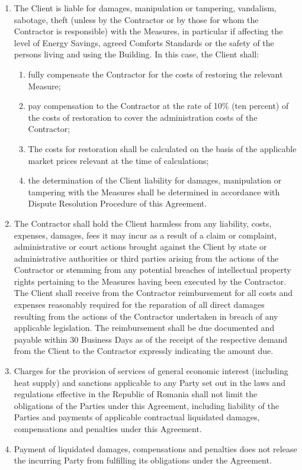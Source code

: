 \begin{multicols}{2}
\begin{enumerate}
\begin{enumerate}
	\end{enumerate}
	\item	The Client is liable for damages, manipulation or tampering, vandalism, sabotage, theft (unless by the Contractor or by those for whom the Contractor is responsible) with the Measures, in particular if affecting the level of Energy Savings, agreed Comforts Standards or the safety of the persons living and using the Building. In this case, the Client shall:
	\begin{enumerate}
		\item	fully compensate the Contractor for the costs of restoring the relevant Measure;
		\item	pay compensation to the Contractor at the rate of 10\% (ten percent) of the costs of restoration to cover the administration costs of the Contractor;
		\item	The costs for restoration shall be calculated on the basis of the applicable market prices relevant at the time of calculations;
		\item	the determination of the Client liability for damages, manipulation or tampering with the Measures shall be determined in accordance with Dispute Resolution Procedure of this Agreement.
	\end{enumerate}
	\item	The Contractor shall hold the Client harmless from any liability, costs, expenses, damages, fees it may incur as a result of a claim or complaint, administrative or court actions brought against the Client by state or administrative authorities or third parties arising from the actions of the Contractor or stemming from any potential breaches of intellectual property rights pertaining to the Measures having been executed by the Contractor. The Client shall receive from the Contractor reimbursement for all costs and expenses reasonably required for the reparation of all direct damages resulting from the actions of the Contractor undertaken in breach of any applicable legislation. The reimbursement shall be due documented and payable within 30 Business Days as of the receipt of the respective demand from the Client to the Contractor expressly indicating the amount due.
	\item	Charges for the provision of services of general economic interest (including heat supply) and sanctions applicable to any Party set out in the laws and regulations effective in the Republic of Romania shall not limit the obligations of the Parties under this Agreement, including liability of the Parties and payments of applicable contractual liquidated damages, compensations and penalties under this Agreement.
	\item	Payment of liquidated damages, compensations and penalties does not release the incurring Party from fulfilling its obligations under the Agreement.
\end{enumerate}


\end{multicols}
